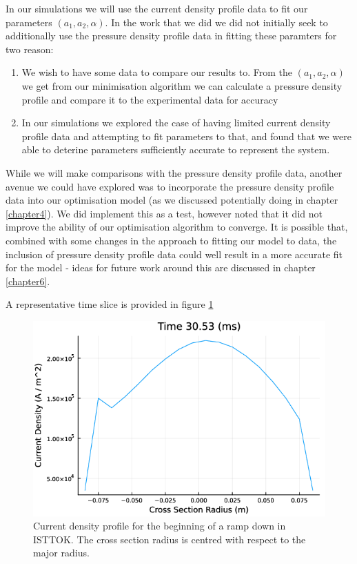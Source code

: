 In our simulations we will use the current density profile data to fit our parameters $(a_1, a_2, \alpha)$. 
In the work that we did we did not initially seek to additionally use the pressure density profile data in fitting 
these paramters for two reason:
\begin{enumerate}
    \item We wish to have some data to compare our results to. From the $(a_1, a_2, \alpha)$ we get from our 
    minimisation algorithm we can calculate a pressure density profile and compare it to the experimental data for accuracy
    \item In our simulations we explored the case of having limited current density profile data and attempting to 
    fit parameters to that, and found that we were able to deterine parameters sufficiently accurate to represent the system.
\end{enumerate}
While we will make comparisons with the pressure density profile data, another avenue we could have explored 
was to incorporate the pressure density profile data into our optimisation model (as we discussed potentially doing in chapter \ref{chapter4}). 
We did implement this as a test, however noted that it did not improve the ability of our optimisation algorithm to converge. It is possible 
that, combined with some changes in the approach to fitting our model to data, the inclusion of pressure density profile data could well result in 
a more accurate fit for the model - ideas for future work around this are discussed in chapter \ref{chapter6}.

A representative time slice is provided in figure \ref{current-profile-unnormalised-0}

\begin{figure}[h!]
    \centering
    \includegraphics[scale=0.6]{imgs/c5/current-profile-unnormalised-0.png}
    \caption{Current density profile for the beginning of a ramp down in ISTTOK. The cross section radius is centred 
    with respect to the major radius.}
    \label{current-profile-unnormalised-0}
\end{figure}\newpage

